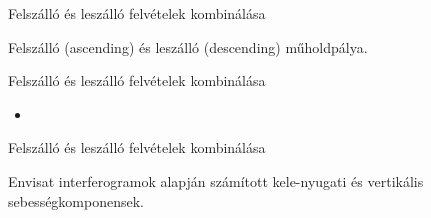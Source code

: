 \def\ft{Felszálló és leszálló felvételek kombinálása}


\begin{frame}{\ft}
    \begin{minic}{0.75}
    \end{minic}
    \centering
    
    Felszálló (ascending) és leszálló (descending) műholdpálya.
\end{frame}

\begin{frame}{\ft}
    \begin{minipage}[c]{0.6\textwidth}
    \end{minipage}
    \begin{minipage}[c]{0.35\textwidth}
        \begin{itemize}
            \item 
        \end{itemize}
    \end{minipage}
\end{frame}


\begin{frame}{\ft}
    \begin{minic}{0.8}
    \end{minic}
    \centering
    
    Envisat interferogramok alapján számított kele-nyugati és vertikális sebességkomponensek.
\end{frame}
